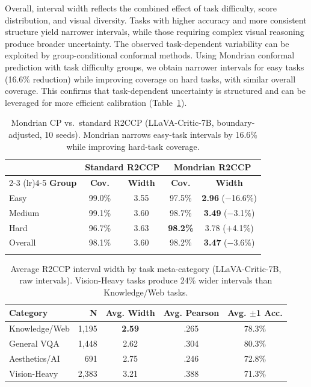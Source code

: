 \documentclass{article}
\begin{document}
Overall, interval width reflects the combined effect of task difficulty, score distribution, and visual diversity. Tasks with higher accuracy and more consistent structure yield narrower intervals, while those requiring complex visual reasoning produce broader uncertainty. The observed task-dependent variability can be exploited by group-conditional conformal methods. Using Mondrian conformal prediction with task difficulty groups, we obtain narrower intervals for easy tasks (16.6\% reduction) while improving coverage on hard tasks, with similar overall coverage. This confirms that task-dependent uncertainty is structured and can be leveraged for more efficient calibration (Table~\ref{tab:mondrian}).

\begin{table}[t]
\centering
\caption{Mondrian CP vs.\ standard R2CCP (LLaVA-Critic-7B, boundary-adjusted, 10 seeds). Mondrian narrows easy-task intervals by 16.6\% while improving hard-task coverage.}
\label{tab:mondrian}
\small
\begin{tabular}{lcccc}
\toprule
& \multicolumn{2}{c}{\textbf{Standard R2CCP}} & \multicolumn{2}{c}{\textbf{Mondrian R2CCP}} \\
\cmidrule(lr){2-3} \cmidrule(lr){4-5}
\textbf{Group} & \textbf{Cov.} & \textbf{Width} & \textbf{Cov.} & \textbf{Width} \\
\midrule
Easy & 99.0\% & 3.55 & 97.5\% & \textbf{2.96} ($-$16.6\%) \\
Medium & 99.1\% & 3.60 & 98.7\% & \textbf{3.49} ($-$3.1\%) \\
Hard & 96.7\% & 3.63 & \textbf{98.2\%} & 3.78 ($+$4.1\%) \\
\midrule
Overall & 98.1\% & 3.60 & 98.2\% & \textbf{3.47} ($-$3.6\%) \\
\bottomrule \vspace{-10pt}
\end{tabular}
\end{table}

\begin{table}[t]
\centering
\caption{Average R2CCP interval width by task meta-category (LLaVA-Critic-7B, raw intervals). Vision-Heavy tasks produce 24\% wider intervals than Knowledge/Web tasks.}
\label{tab:category}
\small
\begin{tabular}{lrccc}
\toprule
\textbf{Category} & \textbf{N} & \textbf{Avg. Width} & \textbf{Avg. Pearson} & \textbf{Avg. $\pm$1 Acc.} \\
\midrule
Knowledge/Web & 1,195 & \textbf{2.59} & .265 & 78.3\% \\
General VQA & 1,448 & 2.62 & .304 & 80.3\% \\
Aesthetics/AI & 691 & 2.75 & .246 & 72.8\% \\
Vision-Heavy & 2,383 & 3.21 & .388 & 71.3\% \\
\bottomrule
\end{tabular}
\end{table}
\end{document}
